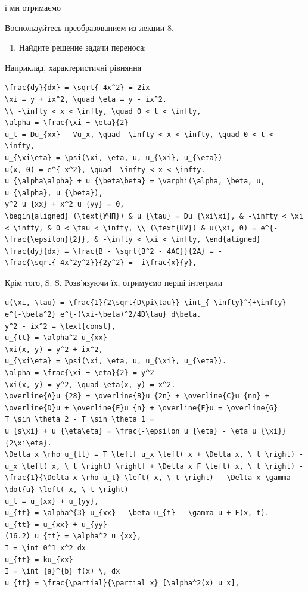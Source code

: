 \documentclass[
  ukrainian,
]{article}
\providecommand{\tightlist}{%
  \setlength{\itemsep}{0pt}\setlength{\parskip}{0pt}}
\begin{document}
і ми отримаємо

Воспользуйтесь преобразованием из лекции 8.

\begin{enumerate}
\def\labelenumi{\arabic{enumi}.}
\setcounter{enumi}{2}
\tightlist
\item
  Найдите решение задачи переноса:
\end{enumerate}

Наприклад, характеристичні рівняння

\begin{verbatim}
\frac{dy}{dx} = \sqrt{-4x^2} = 2ix
\xi = y + ix^2, \quad \eta = y - ix^2.
\\ -\infty < x < \infty, \quad 0 < t < \infty,
\alpha = \frac{\xi + \eta}{2}
u_t = Du_{xx} - Vu_x, \quad -\infty < x < \infty, \quad 0 < t < \infty,
u_{\xi\eta} = \psi(\xi, \eta, u, u_{\xi}, u_{\eta})
u(x, 0) = e^{-x^2}, \quad -\infty < x < \infty.
u_{\alpha\alpha} + u_{\beta\beta} = \varphi(\alpha, \beta, u, u_{\alpha}, u_{\beta}),
y^2 u_{xx} + x^2 u_{yy} = 0,
\begin{aligned} (\text{УЧП}) & u_{\tau} = Du_{\xi\xi}, & -\infty < \xi < \infty, & 0 < \tau < \infty, \\ (\text{HV}) & u(\xi, 0) = e^{-\frac{\epsilon}{2}}, & -\infty < \xi < \infty, \end{aligned}
\frac{dy}{dx} = \frac{B - \sqrt{B^2 - 4AC}}{2A} = -\frac{\sqrt{-4x^2y^2}}{2y^2} = -i\frac{x}{y},
\end{verbatim}

Крім того, S. S. Розв'язуючи їх, отримуємо перші інтеграли

\begin{verbatim}
u(\xi, \tau) = \frac{1}{2\sqrt{D\pi\tau}} \int_{-\infty}^{+\infty} e^{-\beta^2} e^{-(\xi-\beta)^2/4D\tau} d\beta.
y^2 - ix^2 = \text{const},
u_{tt} = \alpha^2 u_{xx}
\xi(x, y) = y^2 + ix^2,
u_{\xi\eta} = \psi(\xi, \eta, u, u_{\xi}, u_{\eta}).
\alpha = \frac{\xi + \eta}{2} = y^2
\xi(x, y) = y^2, \quad \eta(x, y) = x^2.
\overline{A}u_{28} + \overline{B}u_{2n} + \overline{C}u_{nn} + \overline{D}u + \overline{E}u_{n} + \overline{F}u = \overline{G}
T \sin \theta_2 - T \sin \theta_1 =
u_{s\xi} + u_{\eta\eta} = \frac{-\epsilon u_{\eta} - \eta u_{\xi}}{2\xi\eta}.
\Delta x \rho u_{tt} = T \left[ u_x \left( x + \Delta x, \ t \right) - u_x \left( x, \ t \right) \right] + \Delta x F \left( x, \ t \right) - \frac{1}{\Delta x \rho u_t} \left( x, \ t \right) - \Delta x \gamma \dot{u} \left( x, \ t \right)
u_t = u_{xx} + u_{yy},
u_{tt} = \alpha^{3} u_{xx} - \beta u_{t} - \gamma u + F(x, t).
u_{tt} = u_{xx} + u_{yy}
(16.2) u_{tt} = \alpha^2 u_{xx},
I = \int_0^1 x^2 dx
u_{tt} = ku_{xx}
I = \int_{a}^{b} f(x) \, dx
u_{tt} = \frac{\partial}{\partial x} [\alpha^2(x) u_x],
\end{verbatim}
\end{document}

